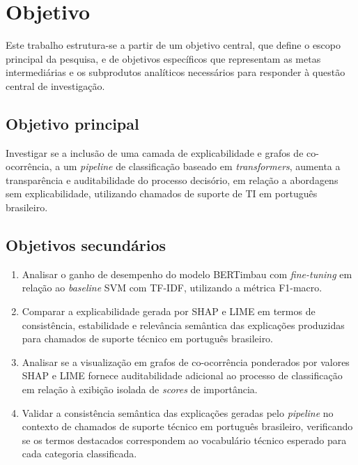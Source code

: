\documentclass[
    12pt,                %
    openright,           %
    oneside,             %
    a4paper,             %
    english,             %
    brazil               %
]{abntex2}
\begin{document}
\section{Objetivo}
\label{sec:objetivo}

Este trabalho estrutura-se a partir de um objetivo central, que define o escopo principal da pesquisa, e de objetivos específicos que representam as metas intermediárias e os subprodutos analíticos necessários para responder à questão central de investigação.

\subsection{Objetivo principal}

Investigar se a inclusão de uma camada de explicabilidade e grafos de co-ocorrência, a um \textit{pipeline} de classificação baseado em \textit{transformers}, aumenta a transparência e auditabilidade do processo decisório, em relação a abordagens sem explicabilidade, utilizando chamados de suporte de TI em português brasileiro.

\subsection{Objetivos secundários}

\begin{enumerate}

    \item Analisar o ganho de desempenho do modelo BERTimbau com 
    \textit{fine-tuning} em relação ao \textit{baseline} SVM com 
    TF-IDF, utilizando a métrica F1-macro.

    \item Comparar a explicabilidade gerada por SHAP e LIME em 
    termos de consistência, estabilidade e relevância semântica 
    das explicações produzidas para chamados de suporte técnico 
    em português brasileiro.

    \item Analisar se a visualização em grafos de co-ocorrência 
    ponderados por valores SHAP e LIME fornece auditabilidade 
    adicional ao processo de classificação em relação à exibição 
    isolada de \textit{scores} de importância.

    \item Validar a consistência semântica das explicações 
    geradas pelo \textit{pipeline} no contexto de chamados de 
    suporte técnico em português brasileiro, verificando se os 
    termos destacados correspondem ao vocabulário técnico 
    esperado para cada categoria classificada.

\end{enumerate}
\end{document}

